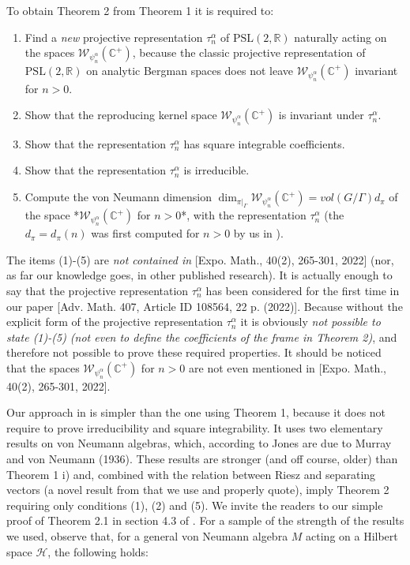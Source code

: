 \documentclass[11pt,reqno]{amsart}
\numberwithin{equation}{section}
\theoremstyle{plain}
\theoremstyle{definition}
\theoremstyle{remark}
\begin{document}
To obtain Theorem 2 from Theorem 1 it is required to:

\begin{enumerate}
\item Find a \textsl{new} projective representation $\tau _{n}^{\alpha }$ of 
$\mathrm{PSL}(2,\mathbb{R})$ naturally acting on the spaces $\mathcal{W}%
_{\psi _{n}^{\alpha }}(\mathbb{C}^{+})$, because the classic projective
representation of $\mathrm{PSL}(2,\mathbb{R})$ on analytic Bergman spaces
does not leave $\mathcal{W}_{\psi _{n}^{\alpha }}(\mathbb{C}^{+})$ invariant
for $n>0$.

\item Show that the reproducing kernel space $\mathcal{W}_{\psi _{n}^{\alpha
}}(\mathbb{C}^{+})$ is invariant under $\tau _{n}^{\alpha }$.

\item Show that the representation $\tau _{n}^{\alpha }$ has square
integrable coefficients.

\item Show that the representation $\tau _{n}^{\alpha }$ is irreducible.

\item Compute the von Neumann dimension $\dim _{\pi |_{\Gamma }}\mathcal{W}%
_{\psi _{n}^{\alpha }}(\mathbb{C}^{+})\mathcal{=}vol(G/\Gamma )d_{\pi }$ of
the space *$\mathcal{W}_{\psi _{n}^{\alpha }}(\mathbb{C}^{+})$ for $n>0$*,
with the representation $\tau _{n}^{\alpha }$ (the $d_{\pi }=d_{\pi }(n)$
was first computed for $n>0$ by us in \cite{Affine}).
\end{enumerate}

The items (1)-(5) are \textsl{not contained in} [Expo. Math., 40(2),
265-301, 2022] (nor, as far our knowledge goes, in other published
research). It is actually enough to say that the projective representation $%
\tau _{n}^{\alpha }$ has been considered for the first time in our paper
[Adv. Math. 407, Article ID 108564, 22 p. (2022)]. Because without the
explicit form of the projective representation $\tau _{n}^{\alpha }$ it is
obviously \emph{not possible to state (1)-(5) (not even to define the
coefficients of the frame in Theorem 2)}, and therefore not possible to
prove these required properties. It should be noticed that the spaces $%
\mathcal{W}_{\psi _{n}^{\alpha }}(\mathbb{C}^{+})$ for $n>0$ are not even
mentioned in [Expo. Math., 40(2), 265-301, 2022].

Our approach in \cite{Affine} is simpler than the one using Theorem 1,
because it does not require to prove irreducibility and square
integrability. It uses two elementary results on von Neumann algebras,
which, according to Jones \cite[Theorem 3.5, (viii),(ix)]{Jones} are due to
Murray and von Neumann \cite{MurrayvonNeumann} (1936). These results are
stronger (and off course, older) than Theorem 1 i) and, combined with the
relation between Riesz and separating vectors (a novel result from \cite%
{Jordi} that we use and properly quote), imply Theorem 2 requiring only
conditions (1), (2) and (5). We invite the readers to our simple proof of
Theorem 2.1 in section 4.3 of \cite{Affine}. For a sample of the strength of
the results we used, observe that, for a general von Neumann algebra $M$
acting on a Hilbert space $\mathcal{H}$, the following holds:
\end{document}
